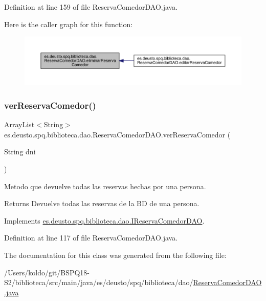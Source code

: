 Definition at line 159 of file Reserva\+Comedor\+D\+A\+O.\+java.

Here is the caller graph for this function\+:
\nopagebreak
\begin{figure}[H]
\begin{center}
\leavevmode
\includegraphics[width=350pt]{classes_1_1deusto_1_1spq_1_1biblioteca_1_1dao_1_1_reserva_comedor_d_a_o_afb0004fc47c5ea34a1187d1f6433892f_icgraph}
\end{center}
\end{figure}
\mbox{\label{classes_1_1deusto_1_1spq_1_1biblioteca_1_1dao_1_1_reserva_comedor_d_a_o_a4cac22c7d393f3994118317472f9ab95}} 
\subsubsection{\texorpdfstring{ver\+Reserva\+Comedor()}{verReservaComedor()}}
{\footnotesize\ttfamily Array\+List$<$String$>$ es.\+deusto.\+spq.\+biblioteca.\+dao.\+Reserva\+Comedor\+D\+A\+O.\+ver\+Reserva\+Comedor (\begin{DoxyParamCaption}\item[{String}]{dni }\end{DoxyParamCaption})}

Metodo que devuelve todas las reservas hechas por una persona. \begin{DoxyReturn}{Returns}
Devuelve todas las reservas de la BD de una persona. 
\end{DoxyReturn}


Implements \mbox{\hyperlink{interfacees_1_1deusto_1_1spq_1_1biblioteca_1_1dao_1_1_i_reserva_comedor_d_a_o_ae20ad98f69700d0c47c0cb274e1f0e33}{es.\+deusto.\+spq.\+biblioteca.\+dao.\+I\+Reserva\+Comedor\+D\+AO}}.



Definition at line 117 of file Reserva\+Comedor\+D\+A\+O.\+java.



The documentation for this class was generated from the following file\+:\begin{DoxyCompactItemize}
\item 
/\+Users/koldo/git/\+B\+S\+P\+Q18-\/\+S2/biblioteca/src/main/java/es/deusto/spq/biblioteca/dao/\mbox{\hyperlink{_reserva_comedor_d_a_o_8java}{Reserva\+Comedor\+D\+A\+O.\+java}}\end{DoxyCompactItemize}
